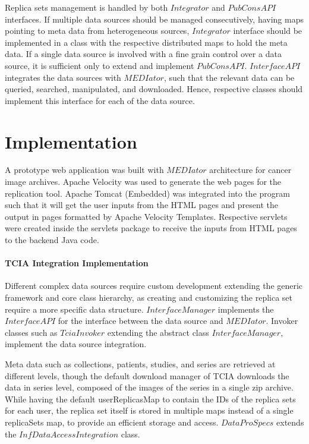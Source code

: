 \documentclass[conference]{IEEEtran}
\begin{document}
Replica sets management is handled by both $Integrator$ and $PubConsAPI$ interfaces. If multiple data sources should be managed consecutively, having maps pointing to meta data from heterogeneous sources, $Integrator$ interface should be implemented in a class with the respective distributed maps to hold the meta data. If a single data source is involved with a fine grain control over a data source, it is sufficient only to extend and implement $PubConsAPI$. $InterfaceAPI$ integrates the data sources with $MEDIator$, such that the relevant data can be queried, searched, manipulated, and downloaded. Hence, respective classes should implement this interface for each of the data source. 


\section{Implementation}
A prototype web application was built with $MEDIator$ architecture for cancer image archives. Apache Velocity was used to generate the web pages for the replication tool. Apache Tomcat (Embedded) was integrated into the program such that it will get the user inputs from the HTML pages and present the output in pages formatted by Apache Velocity Templates. Respective servlets were created inside the servlets package to receive the inputs from HTML pages to the backend Java code.

\paragraph*{\textbf{TCIA Integration Implementation}}
Different complex data sources require custom development extending the generic framework and core class hierarchy, as creating and customizing the replica set require a more specific data structure. $InterfaceManager$ implements the $InterfaceAPI$ for the interface between the data source and $MEDIator$. Invoker classes such as $TciaInvoker$ extending the abstract class $InterfaceManager$, implement the data source integration.

Meta data such as collections, patients, studies, and series are retrieved at different levels, though the default download manager of TCIA downloads the data in series level, composed of the images of the series in a single zip archive. While having the default userReplicasMap to contain the IDs of the replica sets for each user, the replica set itself is stored in multiple maps instead of a single replicaSets map, to provide an efficient storage and access. $DataProSpecs$ extends the $InfDataAccessIntegration$ class. 
\end{document}
